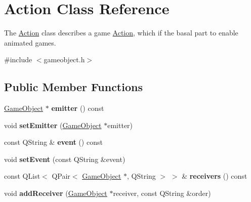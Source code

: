 \hypertarget{class_action}{\section{\-Action \-Class \-Reference}
\label{class_action}
}


\-The \hyperlink{class_action}{\-Action} class describes a game \hyperlink{class_action}{\-Action}, which if the basal part to enable animated games.  




{\ttfamily \#include $<$gameobject.\-h$>$}

\subsection*{\-Public \-Member \-Functions}
\begin{DoxyCompactItemize}
\item 
\hypertarget{class_action_ac9c226c629bd1b6fae5e56f506c24e01}{\hyperlink{class_game_object}{\-Game\-Object} $\ast$ {\bfseries emitter} () const }\label{class_action_ac9c226c629bd1b6fae5e56f506c24e01}

\item 
\hypertarget{class_action_a58c81fb3969aa8dc628ac0191be111ad}{void {\bfseries set\-Emitter} (\hyperlink{class_game_object}{\-Game\-Object} $\ast$emitter)}\label{class_action_a58c81fb3969aa8dc628ac0191be111ad}

\item 
\hypertarget{class_action_a0e6609b994f565205705a3049f971b96}{const \-Q\-String \& {\bfseries event} () const }\label{class_action_a0e6609b994f565205705a3049f971b96}

\item 
\hypertarget{class_action_a6f0965f429083940ce60b58e2159721b}{void {\bfseries set\-Event} (const \-Q\-String \&event)}\label{class_action_a6f0965f429083940ce60b58e2159721b}

\item 
\hypertarget{class_action_ae1807c2a558ee17faaadcb104b3411da}{const \-Q\-List$<$ \-Q\-Pair$<$ \hyperlink{class_game_object}{\-Game\-Object} \*
$\ast$, \-Q\-String $>$ $>$ \& {\bfseries receivers} () const }\label{class_action_ae1807c2a558ee17faaadcb104b3411da}

\item 
\hypertarget{class_action_a3a07b28f27a7e2584b119f395c8d474f}{void {\bfseries add\-Receiver} (\hyperlink{class_game_object}{\-Game\-Object} $\ast$receiver, const \-Q\-String \&order)}\label{class_action_a3a07b28f27a7e2584b119f395c8d474f}


\end{DoxyCompactItemize}
